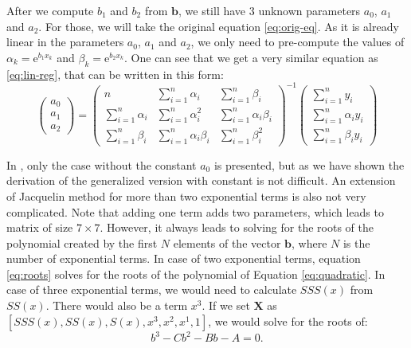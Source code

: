 After we compute $b_1$ and $b_2$ from $\boldsymbol{b}$, we still have 3 unknown parameters $a_0$, $a_1$ and $a_2$. For those, we will take the original equation \ref{eq:orig-eq}. As it is already linear in the parameters $a_0$, $a_1$ and $a_2$, we only need to pre-compute the values of $\alpha_k=\mathrm{e}^{b_1x_k}$ and $\beta_k =\mathrm{e}^{b_2x_k}$.
One can see that we get a very similar equation as \ref{eq:lin-reg}, that can be written in this form:
\begin{equation}
	\begin{pmatrix}
		a_0 \\
		a_1 \\
		a_2
	\end{pmatrix} 
	=
	\begin{pmatrix}
		n & \sum\limits_{i=1}^n\alpha_i & \sum\limits_{i=1}^n\beta_i  \\
		\sum\limits_{i=1}^n\alpha_i & \sum\limits_{i=1}^n\alpha_i^2 & \sum\limits_{i=1}^n\alpha_i\beta_i  \\
		\sum\limits_{i=1}^n\beta_i & \sum\limits_{i=1}^n\alpha_i\beta_i & \sum\limits_{i=1}^n\beta_i^2
	\end{pmatrix}^{-1}
	\begin{pmatrix}
		\sum\limits_{i=1}^ny_i \\
		\sum\limits_{i=1}^n\alpha_iy_i \\
		\sum\limits_{i=1}^n\beta_iy_i
	\end{pmatrix}
\end{equation}

In \cite{jacquelin2014}, only the case without the constant $a_0$ is presented, but as we have shown the derivation of the generalized version with constant is not difficult. An extension of Jacquelin method for more than two exponential terms is also not very complicated. Note that adding one term adds two parameters, which leads to matrix of size $7\times7$. However, it always leads to solving for the roots of the polynomial created by the first $N$ elements of the vector $\boldsymbol{b}$, where $N$ is the number of exponential terms. In case of two exponential terms, equation \ref{eq:roots} solves for the roots of the polynomial of Equation \ref{eq:quadratic}. In case of three exponential terms, we would need to calculate $SSS(x)$ from $SS(x)$. There would also be a term $x^3$. If we set $\boldsymbol{X}$ as $\left[SSS(x),SS(x),S(x),x^3,x^2,x^1,1\right]$, we would solve for the roots of:
\begin{equation}
	b^3-Cb^2-Bb-A=0.
\end{equation}

